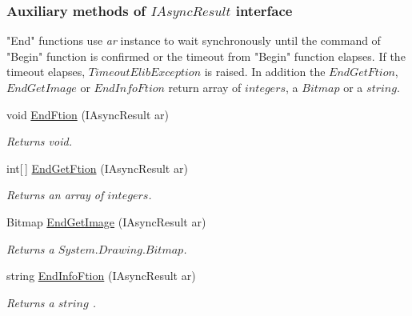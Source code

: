 \subsubsection*{Auxiliary methods of $IAsyncResult$ interface} %
\label{ssub:Auxillary methods}
"End" functions use {\itshape ar\/} instance to wait synchronously until the command of "Begin" function is confirmed
or the timeout from "Begin" function elapses. If the timeout elapses, $TimeoutElibException$ is raised.
In addition the $EndGetFtion$, $EndGetImage$ or $EndInfoFtion$ return array of $integers$, a $Bitmap$ or a $string$.
  \begin{DoxyCompactItemize}

  \item void \hyperlink{class_elib_1_1_epuck_a4e1dcc90a8562f5c12d0bb740e85095c}{EndFtion} (IAsyncResult ar)
  \begin{DoxyCompactList}\small\item\em Returns void. \item\end{DoxyCompactList}

  \item int\mbox{[}$\,$\mbox{]} \hyperlink{class_elib_1_1_epuck_af67fabd4c8d5fc5a9186b37157827512}{EndGetFtion} (IAsyncResult ar)
  \begin{DoxyCompactList}\small\item\em Returns an array of $integers$. \item\end{DoxyCompactList}

  \item Bitmap \hyperlink{class_elib_1_1_epuck_a8b2cf6f690beeab328e5a6c533cfa2b0}{EndGetImage} (IAsyncResult ar)
  \begin{DoxyCompactList}\small\item\em Returns a $System.Drawing.Bitmap$. \item\end{DoxyCompactList}

  \item string \hyperlink{class_elib_1_1_epuck_a74b28dea3f43cda9a42745236a2a0910}{EndInfoFtion} (IAsyncResult ar)
  \begin{DoxyCompactList}\small\item\em Returns a $string$ . \item\end{DoxyCompactList}

  \end{DoxyCompactItemize}


